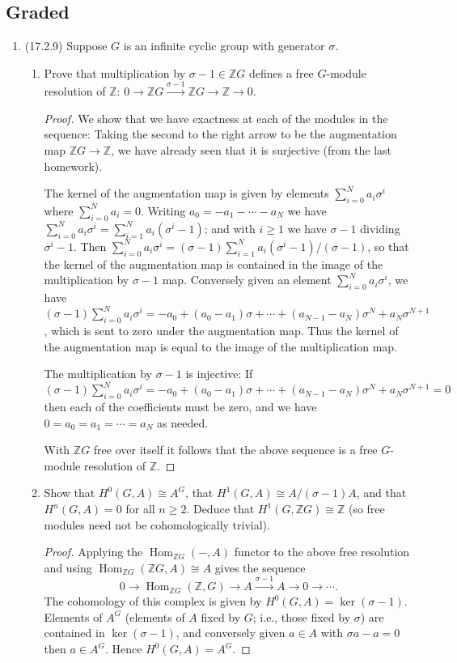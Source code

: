 \documentclass[11pt]{article}
\DeclareMathOperator{\Hom}{Hom}
\begin{document}
\subsection*{Graded}
\begin{enumerate}
    \item (17.2.9) Suppose $G$ is an infinite cyclic group with generator $\sigma$. \begin{enumerate}
        \item Prove that multiplication by $\sigma-1\in\mathbb{Z}G$ defines a free $G$-module resolution of $\mathbb{Z}$: $0\to \mathbb{Z}G\xrightarrow{\sigma-1}\mathbb{Z}G\to\mathbb{Z}\to 0$. \begin{proof}
            We show that we have exactness at each of the modules in the sequence: 
            Taking the second to the right arrow to be the augmentation map $\mathbb{Z}G\to\mathbb{Z}$, we have already seen that it is surjective (from the last homework).
            
            The kernel of the augmentation map is given by elements $\sum_{i=0}^Na_i\sigma^i$ where $\sum_{i=0}^Na_i = 0$. Writing $a_0 = -a_1-\cdots-a_N$ we have $\sum_{i=0}^Na_i\sigma^i = \sum_{i=1}^N a_i(\sigma^i-1)$; and with $i\geq 1$ we have $\sigma-1$ dividing $\sigma^i-1$. Then $\sum_{i=0}^Na_i\sigma^i = (\sigma-1)\sum_{i=1}^N a_i(\sigma^i-1)/(\sigma-1)$, so that the kernel of the augmentation map is contained in the image of the multiplication by $\sigma-1$ map. Conversely given an element $\sum_{i=0}^Na_i\sigma^i$, we have $(\sigma-1)\sum_{i=0}^Na_i\sigma^i = -a_0 + (a_0-a_1)\sigma + \cdots + (a_{N-1}-a_N)\sigma^N + a_N\sigma^{N+1}$, which is sent to zero under the augmentation map. Thus the kernel of the augmentation map is equal to the image of the multiplication map.

            The multiplication by $\sigma-1$ is injective: If $(\sigma-1)\sum_{i=0}^Na_i\sigma^i = -a_0 + (a_0-a_1)\sigma + \cdots + (a_{N-1}-a_N)\sigma^N + a_N\sigma^{N+1} = 0$ then each of the coefficients must be zero, and we have $0 = a_0 = a_1 = \cdots = a_N$ as needed. 

            With $\mathbb{Z}G$ free over itself it follows that the above sequence is a free $G$-module resolution of $\mathbb{Z}$.
        \end{proof}
        \item Show that $H^0(G,A)\cong A^G$, that $H^1(G,A)\cong A/(\sigma-1)A$, and that $H^n(G,A) = 0$ for all $n\geq 2$. Deduce that $H^1(G,\mathbb{Z}G)\cong\mathbb{Z}$ (so free modules need not be cohomologically trivial). \begin{proof}
            Applying the $\Hom_{\mathbb{Z}G}(-,A)$ functor to the above free resolution and using $\Hom_{\mathbb{Z}G}(\mathbb{Z}G,A)\cong A$ gives the sequence \[0\to\Hom_{\mathbb{Z}G}(\mathbb{Z},G)\to A\xrightarrow{\sigma-1} A\to 0\to\cdots.\] The cohomology of this complex is given by $H^0(G,A) = \ker(\sigma-1)$. Elements of $A^G$ (elements of $A$ fixed by $G$; i.e., those fixed by $\sigma$) are contained in $\ker(\sigma-1)$, and conversely given $a\in A$ with $\sigma a -a  = 0$ then $a\in A^G$. Hence $H^0(G,A) = A^G$. 


\end{proof}
\end{enumerate}
\end{enumerate}
\end{document}

